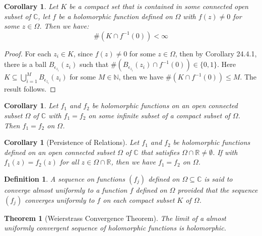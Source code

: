 \documentclass[15pt]{book}
\theoremstyle{break}
\theoremstyle{break}
\newtheorem{thm}{Theorem}[section]
\newtheorem{corL}{Corollary}[lem]
\newtheorem{corT}[lem]{Corollary}
\newtheorem{defn}{Definition}[corL]
\newcommand{\R}{\mathbb{R}}
\newcommand{\N}{\mathbb{N}}
\newcommand{\Complex}{\mathbb{C}}
\begin{document}
\begin{corT}
Let $K$ be a compact set that is contained in some connected open subset of $\Complex$, let $f$ be a holomorphic function defined on $\Omega$ with $f(z) \neq 0$ for some $z\in \Omega$. Then we have: 
$$\#(K\cap f^{-1}(0)) < \infty$$ 
\end{corT}
\begin{proof}
For each $z_i \in K$, since $f(z)\neq 0$ for some $z \in \Omega$, then by Corollary 24.4.1, there is a ball $B_{\epsilon_{z_i}}(z_i)$ such that $\#(B_{\epsilon_{z_i}}(z_i) \cap f^{-1}(0)) \in \{0,1\}$. Here $K \subseteq \bigcup_{i=1}^M B_{\epsilon_{z_i}}(z_i)$ for some $M \in \N$, then we have $\#(K\cap f^{-1}(0)) \leq M$. The result follows. 
\end{proof}

\begin{corT}
Let $f_1$ and $f_2$ be holomorphic functions on an open connected subset $\Omega$ of $\Complex$ with $f_1 = f_2$ on some infinite subset of a compact subset of $\Omega$. Then $f_1 = f_2$ on $\Omega$. 
\end{corT}

\begin{corL}[Persistence of Relations]
Let $f_1$ and $f_2$ be holomorphic functions defined on an open connected subset $\Omega$ of $\Complex$ that satisfies $\Omega \cap \R \neq \emptyset$.
If with $f_1(z) = f_2(z)$ for all $z \in \Omega\cap \R$, then we have $f_1 = f_2$ on $\Omega$. 
\end{corL}

\begin{defn}
A sequence on functions $(f_j)$ defined on $\Omega\subseteq \Complex$ is said to converge almost uniformly to a function $f$ defined on $\Omega$ provided that the sequence $(f_j)$ converges uniformly to $f$ on each compact subset $K$ of $\Omega$.
\end{defn}


\begin{thm}[Weierstrass Convergence Theorem]
The limit of a almost uniformly convergent sequence of holomorphic functions is holomorphic. 
\end{thm}
\end{document}
